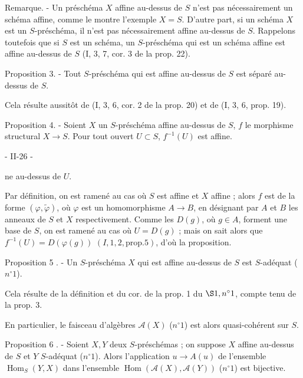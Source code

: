Remarque. - Un préschéma $X$ affine au-dessus de $S$ n'est pas nécessairement un schéma affine, comme le montre l'exemple $X=S$. D'autre part, si un schéma $X$ est un $S$-préschéma, il n'est pas nécessairement affine au-dessus de $S$. Rappelons toutefois que si $S$ est un schéma, un $S$-préschéma qui est un schéma affine est affine au-dessus de $S$ (I, 3, 7, cor. 3 de la prop. 22).

Proposition 3. - Tout $S$-préschéma qui est affine au-dessus de $S$ est séparé au-dessus de $S$.

Cela résulte aussitôt de (I, 3, 6, cor. 2 de la prop. 20) et de (I, 3, 6, prop. 19).

Proposition 4. - Soient $X$ un $S$-préschéma affine au-dessus de $S$, $f$ le morphisme structural $X \to S$. Pour tout ouvert $U \subset S$, $f^{-1}(U)$ est affine.

\newpage


- II-26 -

ne au-dessus de $U$.

Par définition, on est ramené au cas où $S$ est affine et $X$ affine ; alors $f$ est de la forme $(\varphi, \tilde{\varphi})$, où $\varphi$ est un homomorphisme $A \to B$, en désignant par $A$ et $B$ les anneaux de $S$ et $X$ respectivement. Comme les $D(g)$, où $g \in A$, forment une base de $S$, on est ramené au cas où $U = D(g)$ ; mais on sait alors que $f^{-1}(U) = D(\varphi(g))$ $(I, 1, 2, \text{prop.} 5)$, d'où la proposition.

Proposition 5 . - Un $S$-préschéma $X$ qui est affine au-dessus de $S$ est $S$-adéquat ($n^\circ 1$).

Cela résulte de la définition et du cor. de la prop. 1 du $\S 1, n^\circ 1$, compte tenu de la prop. 3.

En particulier, le faisceau d'algèbres $\mathcal{A}(X)$ ($n^\circ 1$) est alors quasi-cohérent sur $S$.

Proposition 6 . - Soient $X, Y$ deux $S$-préschémas ; on suppose $X$ affine au-dessus de $S$ et $Y$ $S$-adéquat ($n^\circ 1$). Alors l'application $u \to A(u)$ de l'ensemble $\operatorname{Hom}_S(Y, X)$ dans l'ensemble $\operatorname{Hom}(\mathcal{A}(X), \mathcal{A}(Y))$ ($n^\circ 1$) est bijective.


